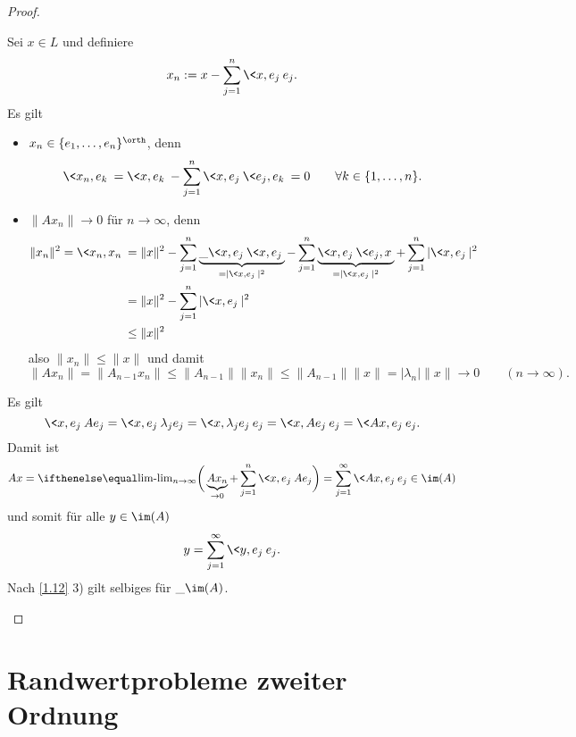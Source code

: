 \begin{st}
\begin{proof}
\begin{enumerate}[1)]
				Sei $x \in L$ und definiere
				\[
					x_n := x - \sum_{j=1}^n \<x,e_j\> e_j.
				\]
				Es gilt
				\begin{itemize}
					\item
						$x_n \in \{e_1,\dotsc,e_n\}^\orth$, denn
						\[
							\<x_n, e_k\> = \<x, e_k\> - \sum_{j=1}^n \<x,e_j\> \<e_j, e_k\> = 0
							\qquad \forall k \in \{1, \dotsc, n\}.
						\]
					\item
						$\|Ax_n\| \to 0$ für $n\to \infty$, denn
						\begin{align*}
							\|x_n\|^2  = \<x_n, x_n\>
							&= \|x\|^2 - \sum_{j=1}^n \underbrace{\_{\<x,e_j\>} \<x,e_j\>}_{=|\<x,e_j\>|^2} - \sum_{j=1}^n \underbrace{\<x,e_j\>\<e_j,x\>}_{=|\<x,e_j\>|^2} + \sum_{j=1}^n |\<x,e_j\>|^2 \\
							&= \|x\|^2 - \sum_{j=1}^n |\<x,e_j\>|^2 \\
							&\le \|x\|^2
						\end{align*}
						also $\|x_n\| \le \|x\|$ und damit
						\[
							\|Ax_n\|
							= \|A_{n-1}x_n\|
							\le \|A_{n-1}\| \|x_n\|
							\le \|A_{n-1}\| \|x\|
							= |\lambda_n| \|x\|
							\to 0
							\qquad (n \to \infty).
						\]
				\end{itemize}
				Es gilt
				\[
					\<x,e_j\> A e_j
					= \<x,e_j\> \lambda_j e_j
					= \<x,\lambda_j e_j\> e_j
					= \<x,A e_j\> e_j
					= \<Ax,e_j\> e_j.
				\]
				Damit ist
				\[
					Ax = \lim_{n\to\infty} \bigg( \underbrace{Ax_n}_{\to 0} + \sum_{j=1}^n \<x,e_j\> Ae_j \bigg)
					= \sum_{j=1}^\infty \<Ax, e_j\> e_j \in \im (A)
				\]
				und somit für alle $y \in \im (A)$
				\[
					y = \sum_{j=1}^\infty \<y,e_j\> e_j.
				\]
				Nach \ref{1.12} 3) gilt selbiges für $\_{\im (A)}$.
		\end{enumerate}
	\end{proof}
\end{st}


\section{Randwertprobleme zweiter Ordnung}



